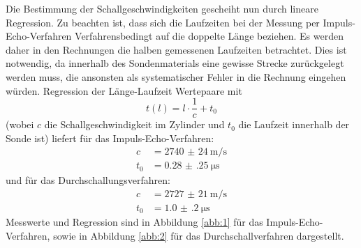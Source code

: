 Die Bestimmung der Schallgeschwindigkeiten gescheiht nun durch lineare Regression.
Zu beachten ist, dass sich die Laufzeiten bei der Messung per Impuls-Echo-Verfahren
Verfahrensbedingt auf die doppelte Länge beziehen. Es werden daher in den Rechnungen die halben gemessenen
Laufzeiten betrachtet.
Dies ist notwendig, da innerhalb des Sondenmaterials eine gewisse Strecke zurückgelegt werden
muss, die ansonsten als systematischer Fehler in die Rechnung eingehen würden.
Regression der Länge-Laufzeit Wertepaare mit
\begin{equation}
  t(l) = l \cdot \frac{1}{c} + t_0
\end{equation}
(wobei $c$ die Schallgeschwindigkeit im Zylinder und $t_0$ die Laufzeit innerhalb der
Sonde ist) liefert für das Impuls-Echo-Verfahren:
\begin{align*}
  c &= \SI[per-mode=reciprocal]{2740(24)}{\metre\per\second}\\
  t_0 &= \SI{0.28(25)}{\micro\second}
\end{align*}
und für das Durchschallungsverfahren:
\begin{align*}
  c &= \SI[per-mode=reciprocal]{2727(21)}{\metre\per\second}\\
  t_0 &= \SI{1.0(2)}{\micro\second}
\end{align*}
Messwerte und Regression sind in Abbildung \ref{abb:1} für das Impuls-Echo-Verfahren,
sowie in Abbildung \ref{abb:2} für das Durchschallverfahren dargestellt.
